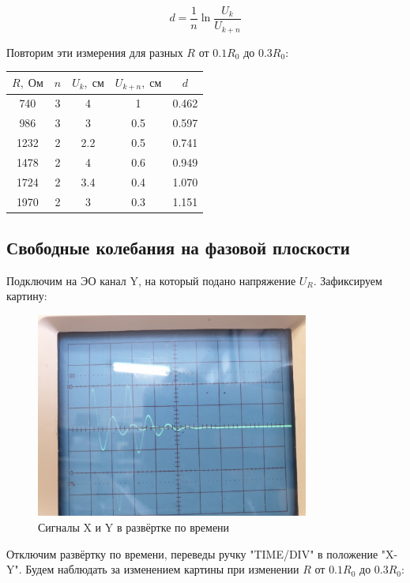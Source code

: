 \documentclass[11pt]{article}
\begin{document}
\[ d = \frac{1}{n}\ln \frac{U_k}{U_{k+n}} \]

Повторим эти измерения для разных \( R \) от \( 0.1R_0 \) до \( 0.3R_0 \):

\begin{table}[H]
    \centering
    \begin{tabular}{|c|c|c|c|c|}
    \hline
    \(R,\; Ом\) & \(n\) & \(U_k,\; см \)& \(U_{k+n},\; см\) & \(d\) \\\hline
    740   & 3 & 4    & 1          & 0.462 \\\hline
    986   & 3 & 3    & 0.5        & 0.597 \\\hline
    1232  & 2 & 2.2  & 0.5        & 0.741 \\\hline
    1478  & 2 & 4    & 0.6        & 0.949 \\\hline
    1724  & 2 & 3.4  & 0.4        & 1.070 \\\hline
    1970  & 2 & 3    & 0.3        & 1.151 \\\hline
    \end{tabular}
\end{table}

\subsection{Свободные колебания на фазовой плоскости} \label{sec:d}
Подключим на ЭО канал Y, на который подано напряжение \( U_R \). Зафиксируем картину:

\begin{figure}[H]
    \centering
    \includegraphics[width = 0.8\textwidth]{X_and_Y_time.jpg}
    \caption{Сигналы X и Y в развёртке по времени}
    \label{fig:XY_time}
\end{figure}

Отключим развёртку по времени, переведы ручку "TIME/DIV" в положение "X-Y".
Будем наблюдать за изменением картины при изменении \( R \) от \(0.1R_0\) до \(0.3R_0\):
\end{document}
